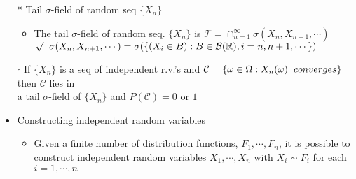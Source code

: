 \documentclass[12pt, A4]{article}
\begin{document}
\begin{itemize}
\begin{itemize}
	\end{itemize}
	\item[*] Tail $\sigma$-field of random seq $\{X_n\}$
	\begin{itemize}
		\item The tail $\sigma$-field of random seq. $\{X_n\}$ is $\mathcal{T}=\cap_{n=1}^\infty \sigma(X_n, X_{n+1},\cdots)$\\
		$\surd\hspace{0.2cm} \sigma(X_n, X_{n+1},\cdots)=\sigma(\{(X_i\in B):B\in\mathcal{B}(\mathbb{R}), i=n,n+1,\cdots\})$
	\end{itemize}
	\item[$\square$] If $\{X_n\}$ is a seq of independent r.v.'s and $\mathcal{C}=\{\omega \in \Omega : X_n(\omega)\hspace{0.2cm} converges\}$ then $ \mathcal{C}$ lies in\\ a tail $\sigma$-field of $\{X_n\}$ and $P(\mathcal{C})=0$ or $1$
	\item Constructing independent random variables
	\begin{itemize}
		\item Given a finite number of distribution functions, $F_1, \cdots, F_n$, it is possible to construct independent random variables $X_1, \cdots, X_n$ with $X_i\sim F_i$ for each $i=1,\cdots,n$
	\end{itemize}
\end{itemize}
\clearpage
\end{document}
